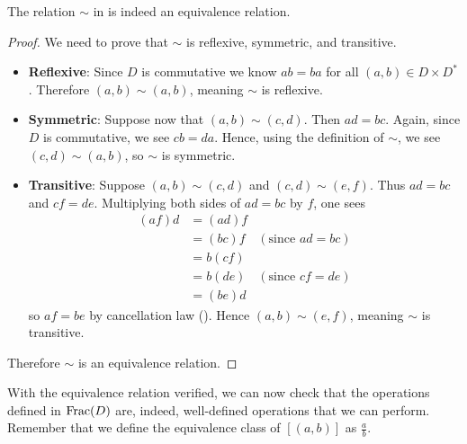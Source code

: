 \begin{proposition}
    The relation $\sim$ in  is indeed an equivalence relation.
\end{proposition}
\begin{proof}
    We need to prove that $\sim$ is reflexive, symmetric, and transitive.
    \begin{itemize}
        \item \textbf{Reflexive}: Since $D$ is commutative we know $ab = ba$ for all $(a,b) \in D \times D^\ast$. Therefore $(a, b) \mathrel{\sim} (a, b)$, meaning $\sim$ is reflexive.

        \item \textbf{Symmetric}: Suppose now that $(a,b)\mathrel{\sim}(c,d)$. Then $ad = bc$. Again, since $D$ is commutative, we see $cb = da$. Hence, using the definition of $\sim$, we see $(c,d)\mathrel{\sim}(a,b)$, so $\sim$ is symmetric.

        \item \textbf{Transitive}: Suppose $(a,b)\mathrel{\sim}(c,d)$ and $(c,d)\mathrel{\sim}(e,f)$. Thus $ad = bc$ and $cf = de$. Multiplying both sides of $ad = bc$ by $f$, one sees
        \begin{align*}
            (af)d &= (ad)f\\
            &= (bc)f & (\text{since } ad = bc)\\
            &= b(cf)\\
            &= b(de) & (\text{since } cf = de)\\
            &= (be)d
        \end{align*}
        so $af = be$ by cancellation law (). Hence $(a,b)\mathrel{\sim}(e,f)$, meaning $\sim$ is transitive.
    \end{itemize}
    Therefore $\sim$ is an equivalence relation.
\end{proof}

With the equivalence relation verified, we can now check that the operations defined in $\mathrm{Frac}(D)$ are, indeed, well-defined operations that we can perform. Remember that we define the equivalence class of $[(a, b)]$ as $\frac ab$.

